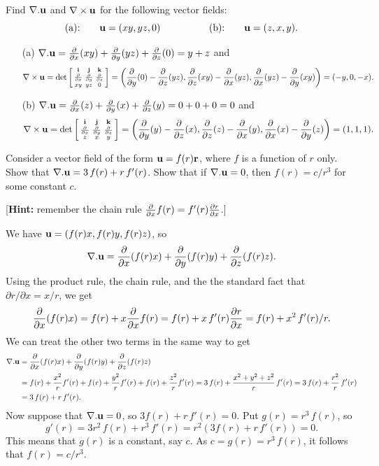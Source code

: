 \documentclass[a4paper]{amsart}
\renewenvironment{solution}{\SolutionInline}{\endSolutionInline}
\begin{document}
\begin{exercise}
 Find $\nabla.\mathbf{u}$ and $\nabla\times\mathbf{u}$ for the following vector fields:
 \[ \text{(a):}\qquad \mathbf{u}=(xy,yz,0) \hspace{5em}
    \text{(b):}\qquad \mathbf{u}=(z,x,y).
 \]
\end{exercise}
\begin{solution}
 \begin{itemize}
  \item[(a)] $\nabla.\mathbf{u}=\frac{\partial}{\partial x}(xy)+\frac{\partial}{\partial y}(yz)+\frac{\partial}{\partial z}(0)=y+z$ and 
   \[ \nabla\times\mathbf{u} =
       \det\left[\begin{smallmatrix} \mathbf{i} & \mathbf{j} & \mathbf{k} \\ \frac{\partial}{\partial x} & \frac{\partial}{\partial y} & \frac{\partial}{\partial z} \\ 
                xy & yz & 0 \end{smallmatrix}\right] = 
        \left(\frac{\partial}{\partial y}(0)-\frac{\partial}{\partial z}(yz),\frac{\partial}{\partial z}(xy)-\frac{\partial}{\partial x}(yz),\frac{\partial}{\partial x}(yz)-\frac{\partial}{\partial y}(xy)\right)
         = (-y,0,-x).
   \]
  \item[(b)] $\nabla.\mathbf{u}=\frac{\partial}{\partial x}(z)+\frac{\partial}{\partial y}(x)+\frac{\partial}{\partial z}(y)=0+0+0=0$ and 
   \[ \nabla\times\mathbf{u} =
       \det\left[\begin{smallmatrix} \mathbf{i} & \mathbf{j} & \mathbf{k} \\ \frac{\partial}{\partial x} & \frac{\partial}{\partial y} & \frac{\partial}{\partial z} \\ 
                z & x & y \end{smallmatrix}\right] = 
        \left(\frac{\partial}{\partial y}(y)-\frac{\partial}{\partial z}(x),\frac{\partial}{\partial z}(z)-\frac{\partial}{\partial x}(y),\frac{\partial}{\partial x}(x)-\frac{\partial}{\partial y}(z)\right)
         = (1,1,1).
   \]
 \end{itemize}
\end{solution}

\begin{exercise}
 Consider a vector field of the form $\mathbf{u}=f(r)\mathbf{r}$, where $f$ is a
 function of $r$ only.  Show that $\nabla.\mathbf{u}=3\,f(r)+r\,f'(r)$.  Show
 that if $\nabla.\mathbf{u}=0$, then $f(r)=c/r^3$ for some constant $c$.

 [\textbf{Hint:} remember the chain rule
 $\frac{\partial}{\partial x} f(r)=f'(r)\frac{\partial r}{\partial x}$.]
\end{exercise}
\begin{solution}
 We have $\mathbf{u}=(f(r)x,f(r)y,f(r)z)$, so 
 \[ \nabla.\mathbf{u} = \frac{\partial}{\partial x}(f(r)x) + \frac{\partial}{\partial y}(f(r)y) + \frac{\partial}{\partial z}(f(r)z). \]
 Using the product rule, the chain rule, and the the standard fact
 that $\partial r/\partial x=x/r$, we get 
 \[ \frac{\partial}{\partial x}(f(r)x) = f(r)+x\frac{\partial}{\partial x} f(r) =
     f(r)+x\,f'(r) \frac{\partial r}{\partial x} = 
      f(r)+x^2\,f'(r)/r.
 \]
 We can treat the other two terms in the same way to get 
 \begin{align*}
  \nabla.\mathbf{u} &=
   \frac{\partial}{\partial x}(f(r)x) + \frac{\partial}{\partial y}(f(r)y) + \frac{\partial}{\partial z}(f(r)z) \\
  &= f(r) + \frac{x^2}{r}f'(r) + 
     f(r) + \frac{y^2}{r}f'(r) + 
     f(r) + \frac{z^2}{r}f'(r) 
   = 3\,f(r) + \frac{x^2+y^2+z^2}{r}\, f'(r) 
   = 3\,f(r) + \frac{r^2}{r}\,f'(r) \\
  &= 3\,f(r)+r\,f'(r).
 \end{align*}
 Now suppose that $\nabla.\mathbf{u}=0$, so $3 f(r)+r\,f'(r)=0$.  Put
 $g(r)=r^3\,f(r)$, so 
 \[ g'(r) = 3r^2\,f(r)+r^3\,f'(r) = 
     r^2(3 f(r)+r\,f'(r)) = 0.
 \]
 This means that $g(r)$ is a constant, say $c$.  As
 $c=g(r)=r^3\,f(r)$, it follows that $f(r)=c/r^3$.  
\end{solution}
\end{document}
